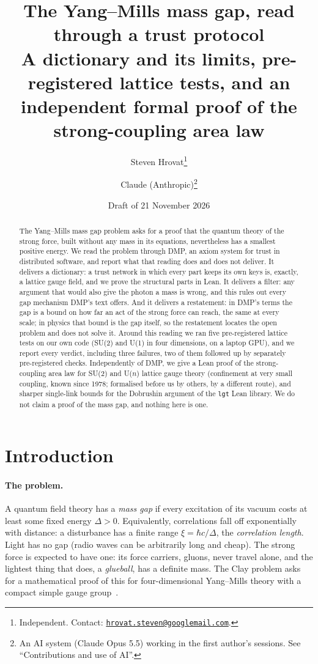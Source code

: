 \documentclass[11pt,a4paper]{article}
\title{The Yang--Mills mass gap, read through a trust protocol\\[0.6ex]
\large A dictionary and its limits, pre-registered lattice tests, and an independent formal proof of the strong-coupling area law}
\author{Steven Hrovat\thanks{Independent. Contact: \href{mailto:hrovat.steven@googlemail.com}{\nolinkurl{hrovat.steven@googlemail.com}}.}
\and Claude (Anthropic)\thanks{An AI system (Claude Opus 5.5) working in the first author's sessions. See ``Contributions and use of AI''.}}
\date{Draft of 21 November 2026}
\begin{document}
\maketitle

\begin{abstract}
\noindent The Yang--Mills mass gap problem asks for a proof that the quantum theory of the strong force, built without any mass in its
equations, nevertheless has a smallest positive energy. We read the problem through DMP, an axiom system for trust in distributed software,
and report what that reading does and does not deliver. It delivers a dictionary: a trust network in which every part keeps its own keys
is, exactly, a lattice gauge field, and we prove the structural parts in Lean. It delivers a filter: any argument that would also give the
photon a mass is wrong, and this rules out every gap mechanism DMP's text offers. And it delivers a restatement: in DMP's terms the gap is
a bound on how far an act of the strong force can reach, the same at every scale; in physics that bound is the gap itself, so the
restatement locates the open problem and does not solve it. Around this reading we ran five pre-registered lattice tests on our own code
(SU(2) and U(1) in four dimensions, on a laptop GPU), and we report every verdict, including three failures, two of them followed up by
separately pre-registered checks. Independently of DMP, we give a Lean proof of the strong-coupling area law for SU(2) and U($n$) lattice
gauge theory (confinement at very small coupling, known since 1978; formalised before us by others, by a different route), and sharper
single-link bounds for the Dobrushin argument of the \texttt{lgt} Lean library. We do not claim a proof of the mass gap, and nothing here is one.
\end{abstract}

\tableofcontents
\bigskip

\section{Introduction}\label{sec:intro}

\paragraph{The problem.} A quantum field theory has a \emph{mass gap} if every excitation of its vacuum costs at least some fixed energy
$\Delta>0$. Equivalently, correlations fall off exponentially with distance: a disturbance has a finite range $\xi=\hbar c/\Delta$, the
\emph{correlation length}. Light has no gap (radio waves can be arbitrarily long and cheap). The strong force is expected to have one: its
force carriers, gluons, never travel alone, and the lightest thing that does, a \emph{glueball}, has a definite mass. The Clay problem
asks for a mathematical proof of this for four-dimensional Yang--Mills theory with a compact simple gauge group~\cite{jaffewitten}.
\end{document}
